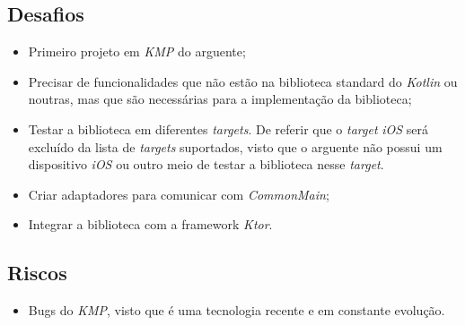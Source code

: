 \subsection{Desafios}\label{subsec:desafios}
\begin{itemize}[topsep=0pt,itemsep=0pt,partopsep=0pt, parsep=0pt]
    \item Primeiro projeto em \textit{KMP} do arguente;
    \item Precisar de funcionalidades que não estão na biblioteca standard do \textit{Kotlin} ou noutras, mas que são necessárias para a implementação da biblioteca;
    \item Testar a biblioteca em diferentes \textit{targets}.
    De referir que o \textit{target} \textit{iOS} será excluído da lista de \textit{targets} suportados, visto que o arguente não possui um dispositivo \textit{iOS} ou outro meio de
    testar a biblioteca nesse \textit{target}.
    \item Criar adaptadores para comunicar com \textit{CommonMain};
    \item Integrar a biblioteca com a framework \textit{Ktor}.
\end{itemize}

\subsection{Riscos}\label{subsec:riscos}
\begin{itemize}[topsep=0pt,itemsep=0pt,partopsep=0pt, parsep=0pt]
    \item Bugs do \textit{KMP}, visto que é uma tecnologia recente e em constante evolução.
\end{itemize}
